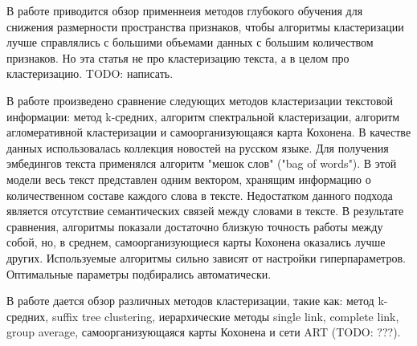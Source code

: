 В работе \cite{deep-clustering-survey} приводится обзор применнеия методов глубокого обучения для снижения размерности пространства признаков, чтобы алгоритмы кластеризации лучше справлялись с большими объемами данных с большим количеством признаков. Но эта статья не про кластеризацию текста, а в целом про кластеризацию. TODO: написать.

В работе \cite{compare-text-clustering-sokolov} произведено сравнение следующих методов кластеризации текстовой информации: метод k-средних, алгоритм спектральной кластеризации, алгоритм агломеративной кластеризации и самоорганизующаяся карта Кохонена. В качестве данных использовалась коллекция новостей на русском языке. Для получения эмбедингов текста применялся алгоритм "мешок слов" ("bag of words"). В этой модели весь текст представлен одним вектором, хранящим информацию о количественном составе каждого слова в тексте. Недостатком данного подхода является отсутствие семантических связей между словами в тексте. В результате сравнения, алгоритмы показали достаточно близкую точность работы между собой, но, в среднем, самоорганизующиеся карты Кохонена оказались лучше других. Используемые алгоритмы сильно зависят от настройки гиперпараметров. Оптимальные параметры подбирались автоматически.

В работе \cite{method-text-clustering-andreev} дается обзор различных методов кластеризации, такие как: метод k-средних, suffix tree clustering, иерархические методы single link, complete link, group average, самоорганизующаяся карты Кохонена и сети ART (TODO: ???).
